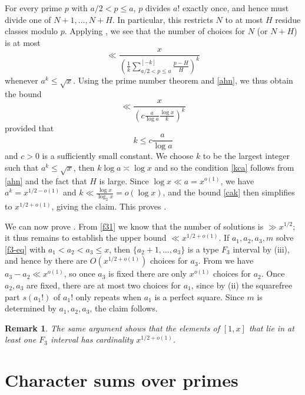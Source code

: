 \documentclass[12pt]{amsart}
\newtheorem{remark}[theorem]{Remark}
\begin{document}
For every prime $p$ with $a/2 < p \leq a$, $p$ divides $a!$ exactly once, and hence must divide one of $N+1,\dots,N+H$.  In particular, this restricts $N$ to at most $H$ residue classes modulo $p$.  Applying ,
we see that the number of choices for $N$ (or $N+H$) is at most
$$ \ll \frac{x}{\left( \frac{1}{k} \sum_{a/2 < p \leq a}^{[-k]} \frac{p-H}{H}\right)^k}$$
whenever $a^k \leq \sqrt{x}$.  Using the prime number theorem and \eqref{ahn}, we thus obtain the bound
\begin{equation}\label{cak}
 \ll \frac{x}{\left( c \frac{a}{\log a} \frac{\log x}{k} \right)^k}
\end{equation}
provided that
\begin{equation}\label{kca}
k \leq c \frac{a}{\log a}
\end{equation}
and $c>0$ is a sufficiently small constant.  We choose $k$ to be the largest integer such that $a^k \leq \sqrt{x}$, then $k \log a \asymp \log x$ and so the condition \eqref{kca} follows from \eqref{ahn} and the fact that $H$ is large.  Since $\log x \ll a = x^{o(1)}$, we have $a^k = x^{1/2-o(1)}$ and $k \ll \frac{\log x}{\log_2 x} = o(\log x)$, and the bound \eqref{cak} then simplifies to $x^{1/2+o(1)}$, giving the claim.  This proves .

We can now prove .  From \eqref{f31} we know that the number of solutions is $\gg x^{1/2}$; it thus remains to establish the upper bound $\ll x^{1/2+o(1)}$.
    If $a_1,a_2,a_3,m$ solve \eqref{f3-eq} with $a_1 < a_2 < a_3 \leq x$, then $\{a_2+1,\dots,a_3\}$ is a type $F_3$ interval by (iii), and hence by  there are $O(x^{1/2+o(1)})$ choices for $a_3$.  From  we have $a_3 - a_2 \ll x^{o(1)}$, so once $a_3$ is fixed there are only $x^{o(1)}$ choices for $a_2$.  Once $a_2, a_3$ are fixed, there are at most two choices for $a_1$, since by (ii) the squarefree part $s(a_1!)$ of $a_1!$ only repeats when $a_1$ is a perfect square.  Since $m$ is determined by $a_1,a_2,a_3$, the claim follows.

\begin{remark}\label{rem-cover} The same argument shows that the elements of $[1,x]$ that lie in at least one $F_3$ interval has cardinality $x^{1/2+o(1)}$.
\end{remark}


\section{Character sums over primes}
\end{document}
